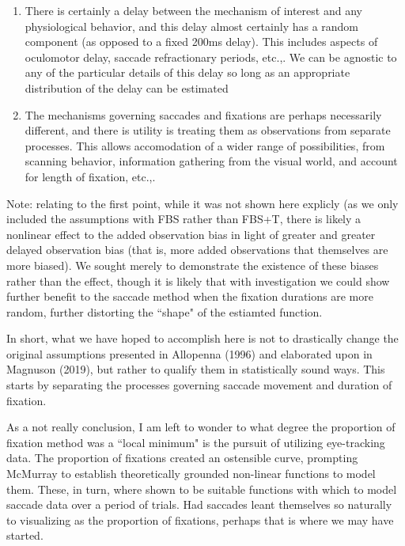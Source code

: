 \documentclass{article}
\begin{document}
\begin{singlespace}
\begin{enumerate}
\vspace{-3mm}
\item There is certainly a delay between the mechanism of interest and any physiological behavior, and this delay almost certainly has a random component (as opposed to a fixed 200ms delay). This includes aspects of oculomotor delay, saccade refractionary periods, etc.,. We can be agnostic to any of the particular details of this delay so long as an appropriate distribution of the delay can be estimated
\item The mechanisms governing saccades and fixations are perhaps necessarily different, and there is utility is treating them as observations from separate processes. This allows accomodation of a wider range of possibilities, from scanning behavior, information gathering from the visual world, and account for length of fixation, etc.,.
\end{enumerate}
\end{singlespace}

Note: relating to the first point, while it was not shown here explicly (as we only included the assumptions with FBS rather than FBS+T, there is likely a nonlinear effect to the added observation bias in light of greater and greater delayed observation bias (that is, more added observations that themselves are more biased). We sought merely to demonstrate the existence of these biases rather than the effect, though it is likely that with investigation we could show further benefit to the saccade method when the fixation durations are more random, further distorting the ``shape" of the estiamted function. 

In short, what we have hoped to accomplish here is not to drastically change the original assumptions presented in Allopenna (1996) and elaborated upon in Magnuson (2019), but rather to qualify them in statistically sound ways. This starts by separating the processes governing saccade movement and duration of fixation.

As a not really conclusion, I am left to wonder to what degree the proportion of fixation method was a  ``local minimum" is the pursuit of utilizing eye-tracking data. The proportion of fixations created an ostensible curve, prompting McMurray to establish theoretically grounded non-linear functions to model them. These, in turn, where shown to be suitable functions with which to model saccade data over a period of trials. Had saccades leant themselves so naturally to visualizing as the proportion of fixations, perhaps that is where we may have started.
\end{document}
